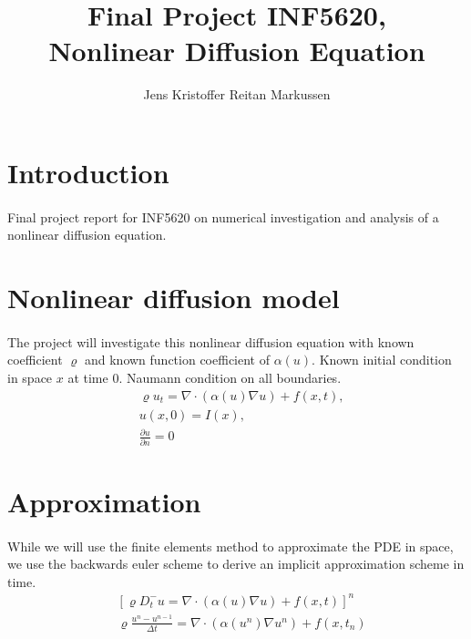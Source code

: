 \documentclass[11pt,a4paper]{article}
\author{Jens Kristoffer Reitan Markussen}
\title{Final Project INF5620,\\ Nonlinear Diffusion Equation}
\begin{document}
\maketitle

\section{Introduction}
\paragraph*{}
Final project report for INF5620 on numerical investigation and analysis of a nonlinear diffusion equation.

\section{Nonlinear diffusion model}
\paragraph*{}
The project will investigate this nonlinear diffusion equation with known coefficient $\varrho$ and known function coefficient of $\alpha(u)$. Known initial condition in space $x$ at time $0$. Naumann condition on all boundaries.
\begin{align}
& \varrho u_t = \nabla \cdot (\alpha(u)\nabla u) + f(x,t),\\
& u(x,0)=I(x),\\
& \frac{\partial u}{\partial n} = 0
\end{align}

\section{Approximation}
\paragraph*{} 
While we will use the finite elements method to approximate the PDE in space, we use the backwards euler scheme to derive an implicit approximation scheme in time.
\begin{align*}
 & \left[\varrho D^-_t u  = \nabla \cdot (\alpha(u)\nabla u) + f(x,t)\right]^n\\
 & \varrho \frac{u^n-u^{n-1}}{\Delta t} = \nabla \cdot (\alpha(u^n)\nabla u^n)+ f(x,t_n)
\end{align*}
\end{document}
